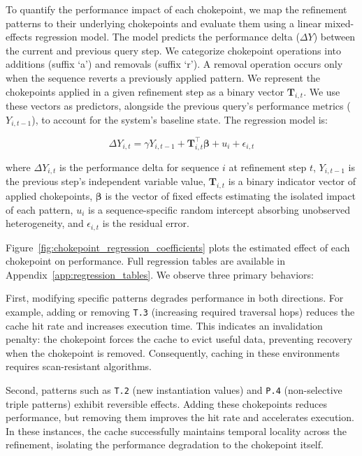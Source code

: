 To quantify the performance impact of each chokepoint, 
we map the refinement patterns to their underlying chokepoints 
and evaluate them using a linear mixed-effects regression model. 
The model predicts the performance delta ($\Delta Y$) between the current and previous query step. 
We categorize chokepoint operations into additions (suffix `a') and removals (suffix `r'). 
A removal operation occurs only when the sequence reverts a previously applied pattern. 
We represent the chokepoints applied in a given refinement step as a binary vector $\mathbf{T}_{i,t}$. 
We use these vectors as predictors, alongside the previous query's performance metrics ($Y_{i,t-1}$), 
to account for the system's baseline state. 
The regression model is:

\begin{equation}
    \Delta Y_{i,t} = \gamma Y_{i,t-1} + \mathbf{T}_{i,t}^{\top} \boldsymbol{\beta} + u_i + \epsilon_{i,t}
\end{equation}

where $\Delta Y_{i,t}$ is the performance delta for sequence $i$ at refinement step $t$, 
$Y_{i,t-1}$ is the previous step's independent variable value, 
$\mathbf{T}_{i,t}$ is a binary indicator vector of applied chokepoints, 
$\boldsymbol{\beta}$ is the vector of fixed effects estimating the isolated impact of each pattern, 
$u_i$ is a sequence-specific random intercept absorbing unobserved heterogeneity, 
and $\epsilon_{i,t}$ is the residual error.

Figure~\ref{fig:chokepoint_regression_coefficients} plots the estimated effect of each chokepoint on performance. 
Full regression tables are available in Appendix~\ref{app:regression_tables}. 
We observe three primary behaviors:

First, modifying specific patterns degrades performance in both directions. 
For example, adding or removing \texttt{T.3} (increasing required traversal hops) 
reduces the cache hit rate and increases execution time. 
This indicates an invalidation penalty: 
the chokepoint forces the cache to evict useful data, 
preventing recovery when the chokepoint is removed. 
Consequently, caching in these environments requires scan-resistant algorithms.

Second, patterns such as \texttt{T.2} (new instantiation values) 
and \texttt{P.4} (non-selective triple patterns) exhibit reversible effects. 
Adding these chokepoints reduces performance, 
but removing them improves the hit rate and accelerates execution. 
In these instances, the cache successfully maintains temporal locality across the refinement, 
isolating the performance degradation to the chokepoint itself.

